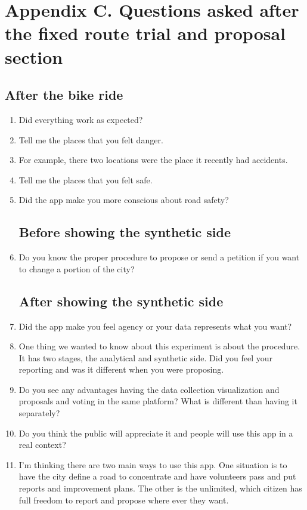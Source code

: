 \chapter{Appendix C. Questions asked after the fixed route trial and
proposal section}

\label{appc:afterquestions}

\section{After the bike ride}
\begin{enumerate}
\item Did everything work as expected?
\item Tell me the places that you felt danger.
\item For example, there two locations were the place it recently had accidents. 
\item Tell me the places that you felt safe.
\item Did the app make you more conscious about road safety? 
\section{Before showing the synthetic side}
\item Do you know the proper procedure to propose or send a petition if you want to change a portion of the city?
\section{After showing the synthetic side}
\item Did the app make you feel agency or your data represents what you want?
\item One thing we wanted to know about this experiment is about the procedure. It has two stages, the analytical and synthetic side. Did you feel your reporting and was it different when you were proposing. 
\item Do you see any advantages having the data collection visualization and proposals and voting in the same platform? What is different than having it separately?
\item Do you think the public will appreciate it and people will use this app in a real context?
\item I'm thinking there are two main ways to use this app. One situation
  is to have the city define a road to concentrate and have volunteers pass
  and put reports and improvement plans. The other is the unlimited, which
  citizen has full freedom to report and propose where ever they want.
\end{enumerate}
\clearpage
\newpage
